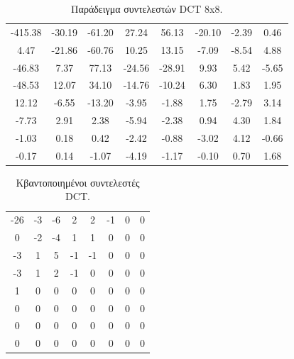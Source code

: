 \begin{table}[H]
    \begin{center}
        \begin{tabular}{| c  c  c  c  c  c  c  c |}
        \hline
        -415.38 & -30.19 & -61.20 & 27.24 & 56.13 & -20.10 & -2.39 & 0.46 \\
        4.47 & -21.86 & -60.76 & 10.25 & 13.15 & -7.09 & -8.54 & 4.88 \\
        -46.83 & 7.37 & 77.13 & -24.56 & -28.91 & 9.93 & 5.42 & -5.65 \\
        -48.53 & 12.07 & 34.10 & -14.76 & -10.24 & 6.30 & 1.83 & 1.95 \\
        12.12 & -6.55 & -13.20 & -3.95 & -1.88 & 1.75 & -2.79 & 3.14 \\
        -7.73 & 2.91 & 2.38 & -5.94 & -2.38 & 0.94 & 4.30 & 1.84 \\
        -1.03 & 0.18 & 0.42 & -2.42 & -0.88 & -3.02 & 4.12 & -0.66 \\
        -0.17 & 0.14 & -1.07 & -4.19 & -1.17 & -0.10 & 0.70 & 1.68 \\
        \hline
        \end{tabular}
    \end{center}
    \caption{Παράδειγμα συντελεστών DCT 8x8. \cite{wiki:jpeg}}
    \label{table:coeff}
\end{table}

\begin{table}[H]
    \begin{center}
        \begin{tabular}{| c  c  c  c  c  c  c  c |}
        \hline
        -26 & -3 & -6 & 2 & 2 & -1 & 0 & 0 \\
        0 & -2 & -4 & 1 & 1 & 0 & 0 & 0 \\
        -3 & 1 & 5 & -1 & -1 & 0 & 0 & 0 \\
        -3 & 1 & 2 & -1 & 0 & 0 & 0 & 0 \\
         1 & 0 & 0 & 0 & 0 & 0 & 0 & 0 \\
        0 & 0 & 0 & 0 & 0 & 0 & 0 & 0 \\
        0 & 0 & 0 & 0 & 0 & 0 & 0 & 0 \\
        0 & 0 & 0 & 0 & 0 & 0 & 0 & 0 \\
        \hline
        \end{tabular}
    \end{center}
    \caption{Κβαντοποιημένοι συντελεστές DCT. \cite{wiki:jpeg}}
    \label{table:results}
\end{table}

